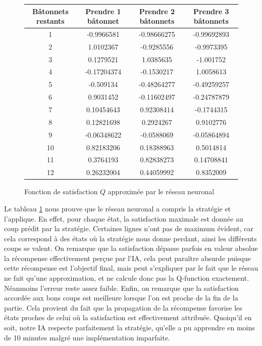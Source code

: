 \begin{figure}[h]
\centering
\begin{tabular}{|c|c|c|c|}
\hline
Bâtonnets restants & Prendre 1 bâtonnet & Prendre 2 bâtonnets & Prendre 3 bâtonnets\\
\hline
1 & -0.9966581 & -0.98666275 & -0.99692893\\
\hline
2 & \cellcolor{green} 1.0102367 & -0.9285556 & -0.9973395\\
\hline
3 & 0.1279521 & \cellcolor{green} 1.0385635 & -1.001752\\
\hline
4 & -0.17204374 & -0.1530217 & \cellcolor{green} 1.0058613\\
\hline
5 & -0.509134 & -0.48264277 & -0.49259257\\
\hline
6 & \cellcolor{green} 0.9031452 & -0.11602497 & -0.24787879\\
\hline
7 & 0.10454643 & \cellcolor{green} 0.92308414 & -0.1744315\\
\hline
8 & 0.12821698 & 0.2924267 & \cellcolor{green} 0.9102776\\
\hline
9 & -0.06348622 & -0.0588069 & -0.05864894\\
\hline
10 & \cellcolor{green} 0.82183206 & 0.18388963 & 0.5014814\\
\hline
11 & 0.3764193 & \cellcolor{green} 0.82838273 & 0.14708841\\
\hline
12 & 0.26232004 & 0.44059992 & \cellcolor{green} 0.8352009\\
\hline
\end{tabular}
\caption{Fonction de satisfaction $Q$ approximée par le réseau neuronal}
\label{tab:Qfunction}
\end{figure}

Le tableau \ref{tab:Qfunction} nous prouve que le réseau neuronal a compris la stratégie et l'applique. En effet, pour chaque état, la satisfaction maximale est donnée
au coup prédit par la stratégie. Certaines lignes n'ont pas de maximum évident, car cela correspond à des états où la stratégie nous donne perdant, ainsi les différents
coups se valent. On remarque que la satisfaction dépasse parfois en valeur absolue la récompense effectivement perçue par l'IA, cela peut paraître absurde puisque cette 
récompense est l'objectif final, mais peut s'expliquer par le fait que le réseau ne fait qu'une approximation, et ne calcule donc pas la Q-function exactement.
Néanmoins l'erreur reste assez faible. Enfin, on remarque que la satisfaction accordée aux bons coups est meilleure lorsque l'on est proche de la fin de la partie.
Cela provient du fait que la propagation de la récompense favorise les états proches de celui où la satisfaction est effectivement attribuée. Quoiqu'il en soit, notre IA
respecte parfaitement la stratégie, qu'elle a pu apprendre en moins de 10 minutes malgré une implémentation imparfaite.



